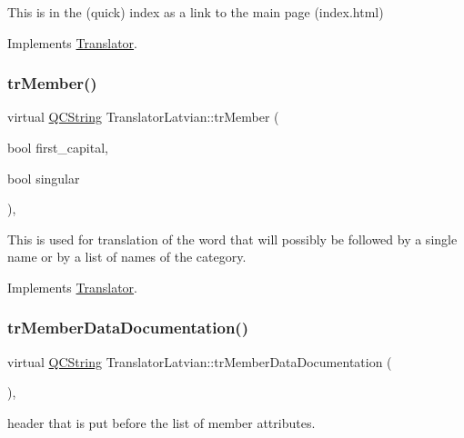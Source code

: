 This is in the (quick) index as a link to the main page (index.\+html) 

Implements \mbox{\hyperlink{class_translator}{Translator}}.

\mbox{\label{class_translator_latvian_a9462bbc83dedf3fb50d623bc491f7554}} 
\subsubsection{\texorpdfstring{trMember()}{trMember()}}
{\footnotesize\ttfamily virtual \mbox{\hyperlink{class_q_c_string}{Q\+C\+String}} Translator\+Latvian\+::tr\+Member (\begin{DoxyParamCaption}\item[{bool}]{first\+\_\+capital,  }\item[{bool}]{singular }\end{DoxyParamCaption})\hspace{0.3cm}{\ttfamily [inline]}, {\ttfamily [virtual]}}

This is used for translation of the word that will possibly be followed by a single name or by a list of names of the category. 

Implements \mbox{\hyperlink{class_translator}{Translator}}.

\mbox{\label{class_translator_latvian_abef9bdea20454169ef123b4b03652f12}} 
\subsubsection{\texorpdfstring{trMemberDataDocumentation()}{trMemberDataDocumentation()}}
{\footnotesize\ttfamily virtual \mbox{\hyperlink{class_q_c_string}{Q\+C\+String}} Translator\+Latvian\+::tr\+Member\+Data\+Documentation (\begin{DoxyParamCaption}{ }\end{DoxyParamCaption})\hspace{0.3cm}{\ttfamily [inline]}, {\ttfamily [virtual]}}

header that is put before the list of member attributes. 

